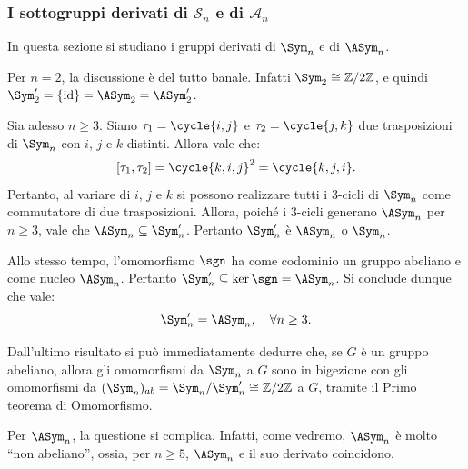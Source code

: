 \documentclass[11pt]{scrartcl}
\begin{document}
	\subsubsection{I sottogruppi derivati di \texorpdfstring{$\mathcal{S}_n$}{Sₙ} e di \texorpdfstring{$\mathcal{A}_n$}{Aₙ}}
	
	In questa sezione si studiano i gruppi derivati di $\Sym_n$ e di
	$\ASym_n$. \medskip
	
	
	Per $n = 2$, la discussione è del tutto banale. Infatti
	$\Sym_2 \cong \Z{2}$, e quindi $\Sym_2' = \{\id\} = \ASym_2 = \ASym_2'$. \medskip
	
	
	Sia adesso $n \geq 3$. Siano $\tau_1 = \cycle{i,j}$ e $\tau_2 = \cycle{j,k}$ due trasposizioni
	di $\Sym_n$ con $i$, $j$ e $k$ distinti. Allora vale che:
	\[ [\tau_1, \tau_2] = \cycle{k, i, j}^2 = \cycle{k, j, i}. \]
	Pertanto, al variare di $i$, $j$ e $k$ si possono realizzare tutti i $3$-cicli
	di $\Sym_n$ come commutatore di due trasposizioni. Allora, poiché
	i $3$-cicli generano $\ASym_n$ per $n \geq 3$, vale che $\ASym_n \subseteq \Sym_n'$.
	Pertanto $\Sym_n'$ è $\ASym_n$ o $\Sym_n$. \medskip
	
	
	Allo stesso tempo, l'omomorfismo $\sgn$ ha come codominio un gruppo abeliano
	e come nucleo $\ASym_n$. Pertanto $\Sym_n' \subseteq \ker \sgn = \ASym_n$. Si
	conclude dunque che vale:
	\[ \Sym_n' = \ASym_n, \quad \forall n \geq 3. \]
	
	\begin{remark}
		Dall'ultimo risultato si può immediatamente dedurre che, se $G$ è
		un gruppo abeliano, allora gli omomorfismi da $\Sym_n$ a $G$ sono
		in bigezione con gli omomorfismi da $(\Sym_n)_{ab} = \Sym_n / \Sym_n' \cong \Z{2}$
		a $G$, tramite il Primo teorema di Omomorfismo.
	\end{remark}
	
	Per $\ASym_n$, la questione si complica. Infatti, come vedremo,
	$\ASym_n$ è molto ``non abeliano'', ossia, per $n \geq 5$,
	$\ASym_n$ e il suo derivato coincidono. \medskip
	
\end{document}
